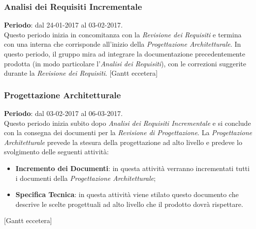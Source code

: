 	\subsubsection{Analisi dei Requisiti Incrementale}
	\textbf{Periodo}: dal 24-01-2017 al 03-02-2017.
	\\ Questo periodo inizia in concomitanza con la \textit{Revisione dei Requisiti} e termina con una  interna che corrisponde all'inizio della \textit{Progettazione Architetturale}. In questo periodo, il gruppo mira ad integrare la documentazione precedentemente prodotta (in modo particolare l'\textit{Analisi dei Requisiti}), con le correzioni suggerite durante la \textit{Revisione dei Requisiti}.
	[Gantt eccetera]
	\subsubsection{Progettazione Architetturale}
	\textbf{Periodo}: dal 03-02-2017 al 06-03-2017.	
	\\ Questo periodo inizia subito dopo \textit{Analisi dei Requisiti Incrementale} e si conclude con la consegna dei documenti per la \textit{Revisione di Progettazione}. La \textit{Progettazione Architetturale} prevede la stesura della progettazione ad alto  livello e predeve lo svolgimento delle seguenti attività:
	\begin{itemize}
		\item \textbf{Incremento dei Documenti}: in questa attività verranno incrementati tutti i documenti della \textit{Progettazione Architetturale};
		\item \textbf{Specifica Tecnica}: in questa attività viene stilato questo documento che descrive le scelte progettuali ad alto livello che il prodotto dovrà rispettare.
	\end{itemize}
	[Gantt eccetera]
